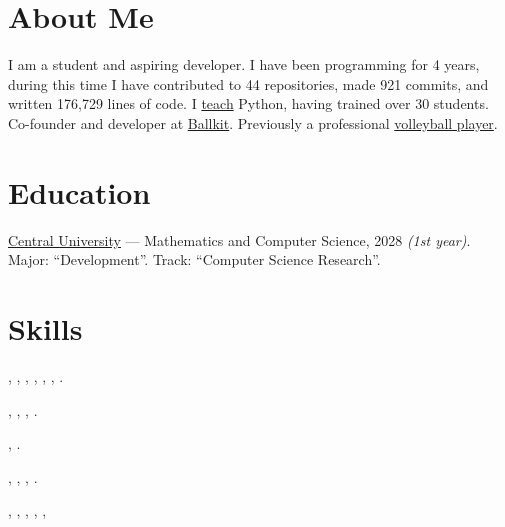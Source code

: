 \documentclass[margin,line]{resume}
\begin{document}
\begin{resume}

  \section{\mysidestyle About Me}
  I am a student and aspiring developer. I have been programming for 4 years, during this time I have contributed to 44 repositories, made 921 commits, and written 176,729 lines of code.
  I \href{https://alchemmist.xyz/teach/individual-education/}{teach}
  Python, having trained over 30 students. Co-founder and developer at \href{https://ballkit.ru/}{Ballkit}. Previously a professional \href{https://alchemmist.github.io/CV/attachments/sport.pdf}{volleyball player}.

  \section{\mysidestyle Education}
  \href{https://centraluniversity.ru/}{Central University} —
  Mathematics and Computer Science, 2028 \textit{(1st year)}.
  Major: “Development”. Track: “Computer Science Research”.

  \section{\mysidestyle Skills}

  \vspace{0.4mm}
  \begin{description}[leftmargin=0pt, itemindent=*, itemsep=0.2pt]
    \item[Python:] \hangindent=9mm 
      , ,
      ,
      , ,
      , .
    \item[Databases:] , ,
      , .
    \item[Message brokers:] , .
    \item[Other technologies:] , ,
      , .
    \item[Dev tools:] , ,
      , , ,
  \end{description}


\end{resume}
\end{document}
